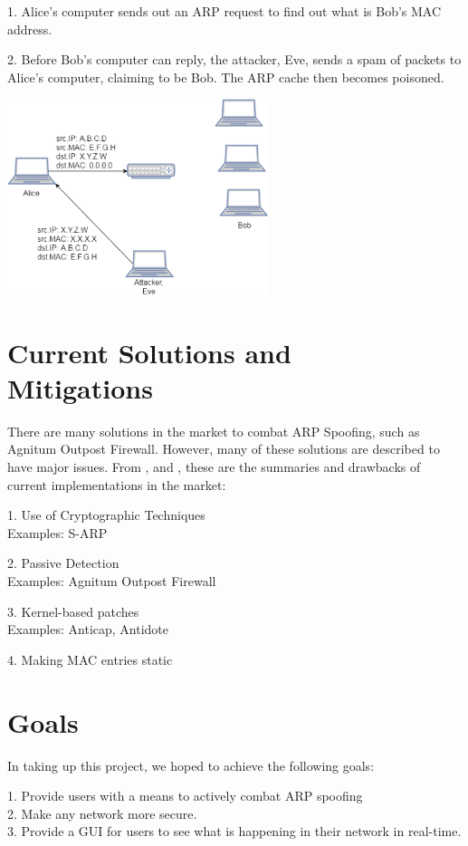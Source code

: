 \documentclass{acm_proc_article-sp}
\begin{document}
1. Alice's computer sends out an ARP request to find out what is Bob's MAC address. 

2. Before Bob's computer can reply, the attacker, Eve, sends a spam of packets to Alice's computer, claiming to be Bob. The ARP cache then becomes poisoned. 

\includegraphics[width=3in]{Poisoned_ARP.eps}


\section{Current Solutions and \\Mitigations}
There are many solutions in the market to combat ARP Spoofing, such as Agnitum Outpost Firewall. However, many of these solutions are described to have major issues. From \cite{vivek:arp}, \cite{navid:arp2} and \cite{goldendeep:arp3},  these are the summaries and drawbacks of current implementations in the market:

1. Use of Cryptographic Techniques \\
Examples: S-ARP 

2. Passive Detection \\
Examples: Agnitum Outpost Firewall

3. Kernel-based patches\\
Examples: Anticap, Antidote 

4. Making MAC entries static\\ 



\section{Goals}
In taking up this project, we hoped to achieve the following goals: 

1. Provide users with a means to actively combat ARP spoofing \\
2. Make any network more secure. \\
3. Provide a GUI for users to see what is happening in their network in real-time. 
\end{document}
